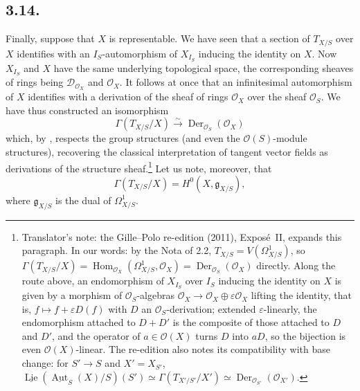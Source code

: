 \subsection*{3.14.}
Finally, suppose that \(X\) is representable. We have seen that a
section of \(T_{X/S}\) over \(X\) identifies with an
\(I_S\)-automorphism of \(X_{I_S}\) inducing the identity on \(X\). Now
\(X_{I_S}\) and \(X\) have the same underlying topological space, the
corresponding sheaves of rings being \(\mathscr D_{\mathcal O_X}\) and
\(\mathcal O_X\). It follows at once that an infinitesimal automorphism of
\(X\) identifies with a derivation of the sheaf of rings \(\mathcal O_X\)
over the sheaf \(\mathcal O_S\). We have thus constructed an isomorphism
\[
  \Gamma(T_{X/S}/X)
  \xrightarrow{\sim}\operatorname{Der}_{\mathcal O_S}(\mathcal O_X)
\]
which, by , respects the group structures (and even the
\(\mathcal O(S)\)-module structures), recovering the classical
interpretation of tangent vector fields as derivations of the structure
sheaf.\footnote{Translator's note: the Gille--Polo re-edition (2011),
Expos\'e~II, expands this paragraph. In our words: by the Nota of 2.2,
\(T_{X/S}=V(\Omega^1_{X/S})\), so
\(\Gamma(T_{X/S}/X)=\operatorname{Hom}_{\mathcal O_X}(\Omega^1_{X/S},\mathcal O_X)
=\operatorname{Der}_{\mathcal O_S}(\mathcal O_X)\) directly. Along the route
above, an endomorphism of \(X_{I_S}\) over \(I_S\) inducing the identity on
\(X\) is given by a morphism of \(\mathcal O_S\)-algebras
\(\mathcal O_X\to\mathcal O_X\oplus\varepsilon\mathcal O_X\) lifting the
identity, that is, \(f\mapsto f+\varepsilon D(f)\) with \(D\) an
\(\mathcal O_S\)-derivation; extended \(\varepsilon\)-linearly, the
endomorphism attached to \(D+D'\) is the composite of those attached to
\(D\) and \(D'\), and the operator of \(a\in\mathcal O(X)\) turns \(D\) into
\(aD\), so the bijection is even \(\mathcal O(X)\)-linear. The re-edition
also notes its compatibility with base change: for \(S'\to S\) and
\(X'=X_{S'}\),
\(\underline{\operatorname{Lie}}(\underline{\operatorname{Aut}}_S(X)/S)(S')
\simeq\Gamma(T_{X'/S'}/X')\simeq\operatorname{Der}_{\mathcal O_{S'}}(\mathcal O_{X'})\).}
Let us note, moreover, that
\[
  \Gamma(T_{X/S}/X)=H^0(X,\mathfrak g_{X/S}),
\]
where \(\mathfrak g_{X/S}\) is the dual of \(\Omega^1_{X/S}\).

